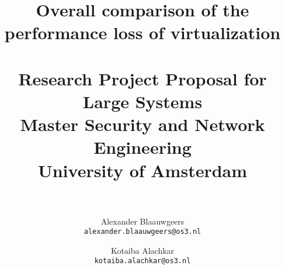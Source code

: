 \documentclass[a4paper, 12pt, one column]{article}
\title{ Overall comparison of the performance
loss of virtualization \\~\\
\large Research Project Proposal for Large Systems
\\Master Security and Network Engineering \\ University of Amsterdam\\~\\}
\author{Alexander Blaauwgeers \\ \texttt{alexander.blaauwgeers@os3.nl} \and Kotaiba Alachkar   \\ \texttt{kotaiba.alachkar@os3.nl}}
\begin{document}
\maketitle
\clearpage
\begin{multicols}{2}














\end{multicols}

\nocite{*}
\printbibliography
\end{document}
